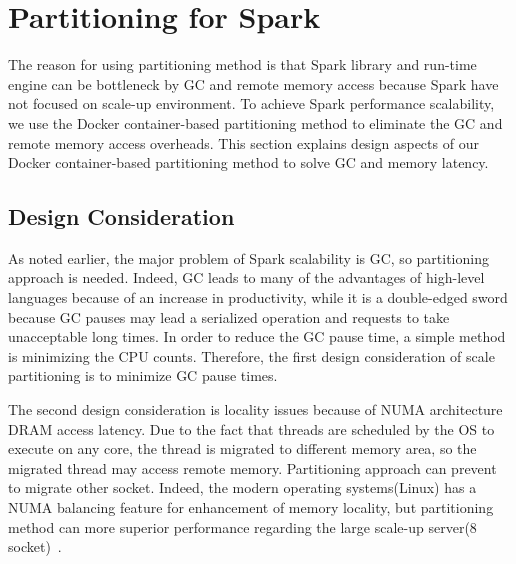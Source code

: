 \section{Partitioning for Spark}

The reason for using partitioning method is that
Spark library and run-time engine can be bottleneck by GC and remote memory access 
because Spark have not focused on scale-up environment.
To achieve Spark performance scalability, we use the Docker container-based
partitioning method to eliminate the GC and remote memory access overheads. 
This section explains design aspects of our Docker container-based
partitioning method to solve GC and memory latency.

\subsection{Design Consideration}

As noted earlier, the major problem of Spark scalability is
GC, so partitioning approach is needed.
Indeed, GC leads to many of the advantages of high-level languages because of
an increase in productivity, while it is a double-edged sword because
GC pauses may lead a serialized operation and requests to take unacceptable long
times.
In order to reduce the GC pause time, a simple method is minimizing the CPU counts.
Therefore, the first design consideration of scale partitioning is to minimize GC
pause times.

The second design consideration is locality issues because of NUMA architecture
DRAM access latency.
Due to the fact that threads are scheduled by the OS to execute on any core, the
thread is migrated to different memory area, so the migrated thread may access
remote memory.
Partitioning approach can prevent to migrate other socket.
Indeed, the modern operating systems(Linux) has a NUMA balancing feature for
enhancement of memory locality, but partitioning method can more superior
performance regarding the large scale-up server(8 socket)~\cite{AutoNUMA}.

